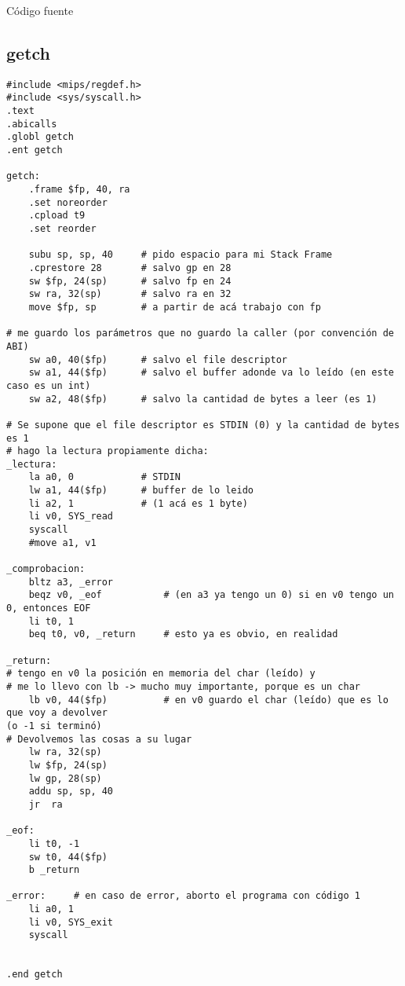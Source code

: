 \documentclass[a4paper,11pt]{article}
\begin{document}
{C\'odigo fuente}
\subsection{getch}
\begin{verbatim}
#include <mips/regdef.h>
#include <sys/syscall.h>
.text
.abicalls
.globl getch
.ent getch

getch:
	.frame $fp, 40, ra
	.set noreorder
	.cpload t9
	.set reorder

	subu sp, sp, 40 	# pido espacio para mi Stack Frame
	.cprestore 28		# salvo gp en 28
	sw $fp, 24(sp)		# salvo fp en 24
	sw ra, 32(sp)		# salvo ra en 32
	move $fp, sp		# a partir de acá trabajo con fp

# me guardo los parámetros que no guardo la caller (por convención de ABI)
	sw a0, 40($fp)		# salvo el file descriptor
	sw a1, 44($fp)		# salvo el buffer adonde va lo leído (en este caso es un int)
	sw a2, 48($fp)		# salvo la cantidad de bytes a leer (es 1)

# Se supone que el file descriptor es STDIN (0) y la cantidad de bytes es 1
# hago la lectura propiamente dicha:
_lectura:
	la a0, 0			# STDIN
	lw a1, 44($fp) 		# buffer de lo leido
	li a2, 1			# (1 acá es 1 byte)
	li v0, SYS_read
	syscall
	#move a1, v1

_comprobacion:
	bltz a3, _error		
	beqz v0, _eof			# (en a3 ya tengo un 0) si en v0 tengo un 0, entonces EOF
	li t0, 1
	beq t0, v0, _return		# esto ya es obvio, en realidad

_return:
# tengo en v0 la posición en memoria del char (leído) y
# me lo llevo con lb -> mucho muy importante, porque es un char
	lb v0, 44($fp)			# en v0 guardo el char (leído) que es lo que voy a devolver 
(o -1 si terminó)
# Devolvemos las cosas a su lugar
	lw ra, 32(sp)
	lw $fp, 24(sp)
	lw gp, 28(sp)
	addu sp, sp, 40
	jr	ra

_eof:
	li t0, -1
	sw t0, 44($fp)
	b _return

_error:		# en caso de error, aborto el programa con código 1
	li a0, 1
	li v0, SYS_exit
	syscall


.end getch
\end{verbatim}
\end{document}
